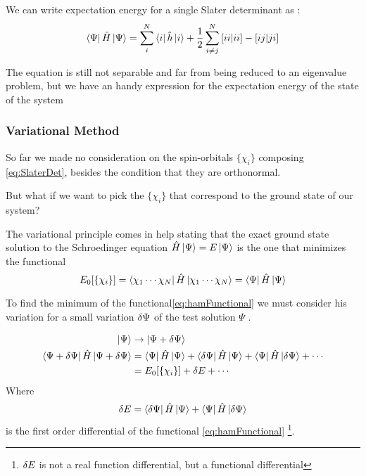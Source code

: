 \documentclass[a4paper,12pt]{article}
\newcommand{\jsqrt}[2]{\bqty{ #1 #1 | #2 #2 }}
\newcommand{\ksqrt}[2]{\bqty{ #1 #2 | #2 #1 }}
\begin{document}
We can write expectation energy for a single Slater determinant as :
\begin{equation}
	\bra{\Psi} \hat{H} \ket{\Psi} = \sum_{i}^{N} \bra{i} \hat{h} \ket{i} + \frac{1}{2} \sum_{i \neq j}^{N} \jsqrt{i}{i} - \ksqrt{i}{j}
\end{equation}

The equation is still not separable and far from being reduced to an eigenvalue problem, but we have an handy expression for the expectation energy of the state of the system

\subsubsection{Variational Method}
So far we made no consideration on the spin-orbitals $\{ \chi_{i} \}$ composing \eqref{eq:SlaterDet}, besides the condition that they are orthonormal.

But what if we want to pick the $\{ \chi_{i} \}$ that correspond to the ground state of our system?

The variational principle comes in help stating that the exact ground state solution to the Schroedinger equation $\hat{H} \ket{\Psi} = E \ket{\Psi}$ is the one that minimizes the functional 
\begin{equation} \label{eq:hamFunctional}
	E_{0}[\{\chi_{i}\}] = \bra{\chi_1 \cdots \chi_N} \hat{H} \ket{\chi_1 \cdots \chi_N} = \bra{\Psi} \hat{H} \ket{\Psi}
\end{equation}

To find the minimum of the functional\eqref{eq:hamFunctional} we must consider his variation for a small variation $\var{\Psi}$ of the test solution $\Psi$  \cite[p.165]{Carati}.  

\begin{align}
	\ket{\Psi} & \rightarrow \ket{\Psi + \var{\Psi}} 
\\
	\bra{\Psi + \var{\Psi}} \hat{H} \ket{\Psi + \var{\Psi}} & = 
		\bra{\Psi} \hat{H} \ket{\Psi} 
		+ \bra{\var{\Psi}} \hat{H} \ket{\Psi} 
		+ \bra{\Psi} \hat{H} \ket{\var{\Psi}} 
		+ \cdots
\\
		 & = E_{0}[\{\chi_{i}\}] + \var{E} + \cdots
\end{align}
Where
\begin{equation}
	\var{E} = \bra{\var{\Psi}} \hat{H} \ket{\Psi} 	+ \bra{\Psi} \hat{H} \ket{\var{\Psi}} 
\end{equation}
is the first order differential of the functional \eqref{eq:hamFunctional} \footnote{$\var{E}$ is not a real function differential, but a functional differential}.
\end{document}
